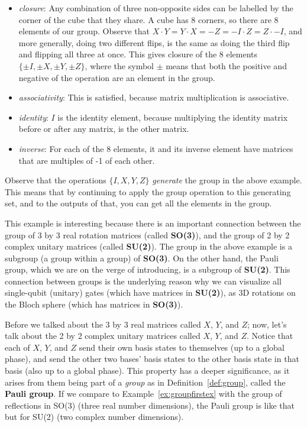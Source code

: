 \documentclass{article}
\theoremstyle{definition}
\begin{document}
\begin{example}
	\begin{itemize}
		\item \textit{closure}: \textnormal{Any combination of three non-opposite sides can be labelled by the corner of the cube that they share.  A cube has 8 corners, so there are 8 elements of our group.  Observe that $X \cdot Y = Y \cdot X = -Z = -I \cdot Z = Z \cdot -I$, and more generally, doing two different flips, is the same as doing the third flip and flipping all three at once.  This gives closure of the 8 elements $\{\pm I, \pm X, \pm Y, \pm Z\}$, where the symbol $\pm$ means that both the positive and negative of the operation are an element in the group.}
		\item \textit{associativity}: \textnormal{This is satisfied, because matrix multiplication is associative.}
		\item \textit{identity}: \textnormal{$I$ is the identity element, because multiplying the identity matrix before or after any matrix, is the other matrix.}
		\item \textit{inverse}: \textnormal{For each of the 8 elements, it and its inverse element have matrices that are multiples of -1 of each other.}
	\end{itemize}
\end{example}
Observe that the operations $\{I,X,Y,Z\}$ \textit{generate} the group in the above example.  This means that by continuing to apply the group operation to this generating set, and to the outputs of that, you can get all the elements in the group.

This example is interesting because there is an important connection between the group of 3 by 3 real rotation matrices (called \textbf{SO(3)}), and the group of 2 by 2 complex unitary matrices (called \textbf{SU(2)}).  The group in the above example is a subgroup (a group within a group) of \textbf{SO(3)}.  On the other hand, the Pauli group, which we are on the verge of introducing, is a subgroup of \textbf{SU(2)}.
This connection between groups is the underlying reason why we can visualize all single-qubit (unitary) gates (which have matrices in \textbf{SU(2)}), as 3D rotations on the Bloch sphere (which has matrices in \textbf{SO(3)}).

Before we talked about the 3 by 3 real matrices called $X$, $Y$, and $Z$; now, let's talk about the 2 by 2 complex unitary matrices called $X$, $Y$, and $Z$.  Notice that each of $X$, $Y$, and $Z$ send their own basis states to themselves (up to a global phase), and send the other two bases' basis states to the other basis state in that basis (also up to a global phase).
This property has a deeper significance, as it arises from them being part of a \textit{group} as in Definition~\ref{def:group}, called the \textbf{Pauli group}.
If we compare to Example~\ref{ex:groupfirstex} with the group of reflections in SO(3) (three real number dimensions), the Pauli group is like that but for SU(2) (two complex number dimensions).
\end{document}

